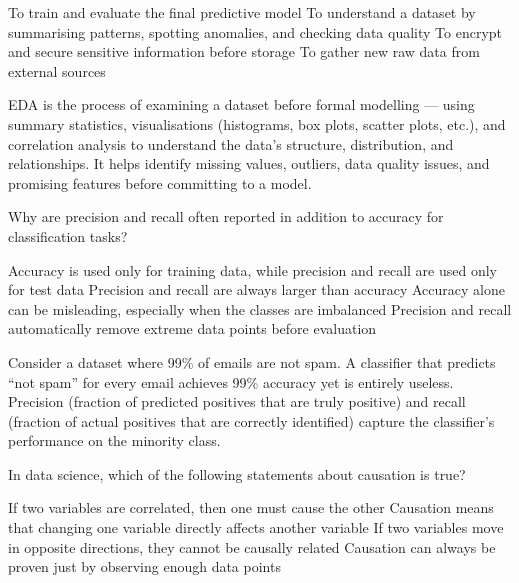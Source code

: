 \documentclass[answers]{exam}
\begin{document}
\begin{questions}
\begin{choices}
    \choice To train and evaluate the final predictive model
    \correctchoice To understand a dataset by summarising patterns, spotting anomalies, and checking data quality
    \choice To encrypt and secure sensitive information before storage
    \choice To gather new raw data from external sources
\end{choices}

\begin{solution}
    EDA is the process of examining a dataset before formal modelling --- using summary statistics, visualisations (histograms, box plots, scatter plots, etc.), and correlation analysis to understand the data's structure, distribution, and relationships.
    It helps identify missing values, outliers, data quality issues, and promising features before committing to a model.
\end{solution}

\question Why are precision and recall often reported in addition to accuracy for classification tasks?

\begin{choices}
    \choice Accuracy is used only for training data, while precision and recall are used only for test data
    \choice Precision and recall are always larger than accuracy
    \correctchoice Accuracy alone can be misleading, especially when the classes are imbalanced
    \choice Precision and recall automatically remove extreme data points before evaluation
\end{choices}

\begin{solution}
    Consider a dataset where 99\% of emails are not spam.
    A classifier that predicts ``not spam'' for every email achieves 99\% accuracy yet is entirely useless.
    Precision (fraction of predicted positives that are truly positive) and recall (fraction of actual positives that are correctly identified) capture the classifier's performance on the minority class.
\end{solution}

\question In data science, which of the following statements about causation is true?

\begin{choices}
    \choice If two variables are correlated, then one must cause the other
    \correctchoice Causation means that changing one variable directly affects another variable
    \choice If two variables move in opposite directions, they cannot be causally related
    \choice Causation can always be proven just by observing enough data points
\end{choices}


\end{questions}
\end{document}
